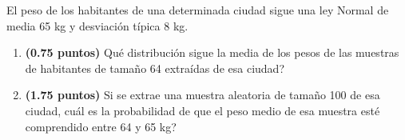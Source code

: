
El peso de los habitantes de una determinada ciudad sigue una ley Normal de media 65 kg y desviación típica 8 kg.
\begin{enumerate}[label=\alph*)]
\item \textbf{(0.75 puntos)} \textquestiondown{}Qué distribución sigue la media de los pesos de las muestras de habitantes de tamaño 64 extraídas de esa ciudad?
\item \textbf{(1.75 puntos)} Si se extrae una muestra aleatoria de tamaño 100 de esa ciudad, \textquestiondown{}cuál es la probabilidad de que el peso medio de esa muestra esté comprendido entre 64 y 65 kg?
\end{enumerate}
